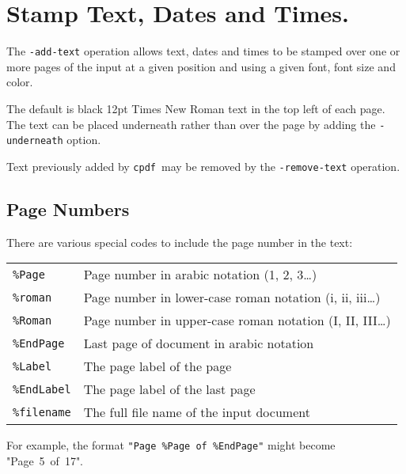 \documentclass{book}
\newcommand{\cpdf}{\texttt{cpdf}}
\begin{document}
  \section{Stamp Text, Dates and Times.}
  The \texttt{-add-text} operation allows text, dates and times to be stamped
over one or more pages of the input at a given position and using a given font,
font size and color.

\noindent{}

  \noindent The default is black 12pt Times New Roman text in the top left of each page. The text can be placed underneath rather than over the page by adding the \texttt{-underneath} option.
  
  Text previously added by \cpdf\ may be removed by the \texttt{-remove-text} operation.

\noindent{}

  \subsection{Page Numbers}
  There are various special codes to include the page number in the text:

  \vspace{2mm}
  \begin{tabular}{ll}
    \texttt{\%Page} & Page number in arabic notation (1, 2, 3\ldots) \\
    \texttt{\%roman} & Page number in lower-case roman notation (i, ii, iii\ldots) \\
    \texttt{\%Roman} & Page number in upper-case roman notation (I, II, III\ldots) \\
    \texttt{\%EndPage} & Last page of document in arabic notation \\
    \texttt{\%Label} & The page label of the page \\
    \texttt{\%EndLabel} & The page label of the last page \\
    \texttt{\%filename} & The full file name of the input document \\
  \end{tabular}

  \vspace{2mm}
  \noindent For example, the format \texttt{"Page~\%Page~of~\%EndPage"} might become "Page~5~of~17".
\end{document}
